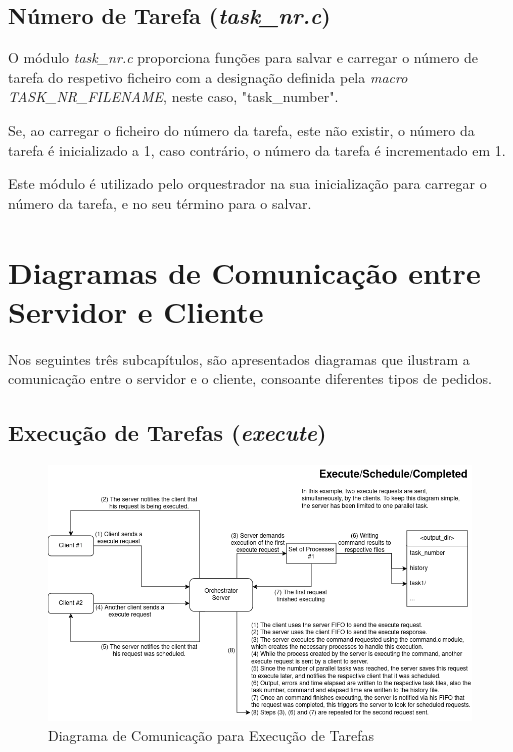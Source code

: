 \documentclass[a4paper,11pt]{scrreprt}
\begin{document}
        \subsection{Número de Tarefa (\textit{task\_nr.c})}
            O módulo \textit{task\_nr.c} proporciona funções para salvar e carregar o número
            de tarefa do respetivo ficheiro com a designação definida pela
            \textit{macro TASK\_NR\_FILENAME}, neste caso, "task\_number".

            Se, ao carregar o ficheiro do número da tarefa, este não existir,
            o número da tarefa é inicializado a 1,
            caso contrário, o número da tarefa é incrementado em 1.

            Este módulo é utilizado pelo orquestrador na sua inicialização para carregar o
            número da tarefa, e no seu término para o salvar.

    \clearpage
    \section{Diagramas de Comunicação entre Servidor e Cliente}
        \label{sec:1.3}
        Nos seguintes três subcapítulos, são apresentados diagramas que ilustram a comunicação
        entre o servidor e o cliente, consoante diferentes tipos de pedidos.
        \subsection{Execução de Tarefas (\textit{execute})}
                \begin{figure}[!ht]
                    \centering
                    \includegraphics[width=\textwidth]{diagrams/execute.png}
                    \caption{\small Diagrama de Comunicação para Execução de Tarefas}
                    \label{fig:1.2}
                \end{figure}
\end{document}
